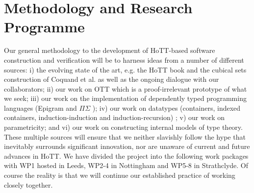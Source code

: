 \documentclass[a4paper,11pt]{article}
\begin{document}







\section{Methodology and Research Programme}



Our general methodology to the development of HoTT-based software
construction and verification will be to harness ideas from a number
of different sources: i) the evolving state of the art, e.g. the HoTT
book and the cubical sets construction of Coquand et al. as well as
the ongoing dialogue with our collaborators; ii) our work on OTT which
is a proof-irrelevant prototype of what we seek; iii) our work on the
implementation of dependently typed programming languages (Epigram and
$\Pi\Sigma$ \cite{alti:pisigma-new,alti:checking}); iv) our work on datatypes (containers, indexed
containers, induction-induction and induction-recursion) 
\cite{alti:fossacs03,alti:tlca03,alti:icalp04,alti:jpartial,alti:mpc04,alti:cont-tcs,alti:regular,alti:cats07,alti:jcats07,alti:lics09,
alti:catind2}
 ; v) our work
on parametricity; and vi) our work on constructing internal models of
type theory. These multiple sources will ensure that we neither
slavishly follow the hype that inevitably surrounds significant
innovation, nor are unaware of current and future advances in HoTT. We
have divided the project into the following work packages with WP1
hosted in Leeds, WP2-4 in Nottingham and WP5-8 in Strathclyde. Of course
the reality is that we will continue our established practice of
working closely together.
\end{document}
